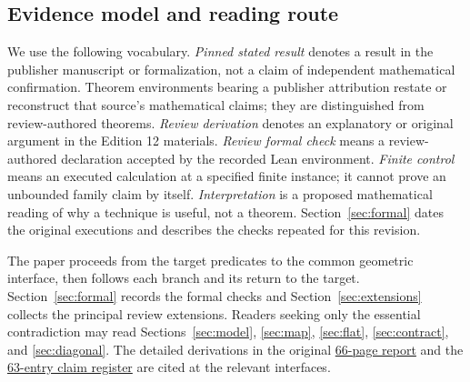 \documentclass[11pt,letterpaper]{article}
\theoremstyle{definition}\newtheorem{definition}[theorem]{Definition}\newtheorem{example}[theorem]{Example}
\theoremstyle{remark}\newtheorem{remark}[theorem]{Remark}
\newcommand{\aud}[2]{\href{https://github.com/nousentllc/VP-VNP-Review/blob/567303d0bcf4f9d54390437b137752446e58ccd6/#1}{#2}}
\begin{document}
\subsection{Evidence model and reading route}
We use the following vocabulary. \emph{Pinned stated result} denotes a result in the publisher manuscript or formalization, not a claim of independent mathematical confirmation. Theorem environments bearing a publisher attribution restate or reconstruct that source's mathematical claims; they are distinguished from review-authored theorems. \emph{Review derivation} denotes an explanatory or original argument in the Edition 12 materials. \emph{Review formal check} means a review-authored declaration accepted by the recorded Lean environment. \emph{Finite control} means an executed calculation at a specified finite instance; it cannot prove an unbounded family claim by itself. \emph{Interpretation} is a proposed mathematical reading of why a technique is useful, not a theorem. Section~\ref{sec:formal} dates the original executions and describes the checks repeated for this revision.

The paper proceeds from the target predicates to the common geometric interface, then follows each branch and its return to the target. Section~\ref{sec:formal} records the formal checks and Section~\ref{sec:extensions} collects the principal review extensions. Readers seeking only the essential contradiction may read Sections~\ref{sec:model}, \ref{sec:map}, \ref{sec:flat}, \ref{sec:contract}, and \ref{sec:diagonal}. The detailed derivations in the original \aud{report/VP_VNP_Research_Review.pdf}{66-page report} and the \aud{report/proof-coverage.csv}{63-entry claim register} are cited at the relevant interfaces.
\end{document}
